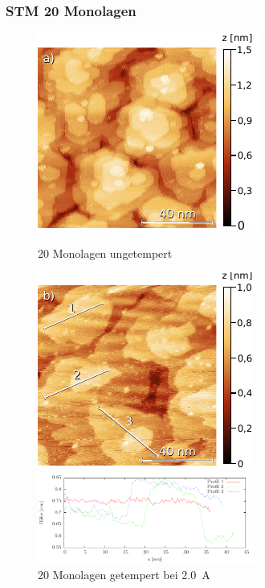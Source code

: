 \documentclass{beamer}
\begin{document}
\begin{frame}
\frametitle{STM 20 Monolagen}
\vspace{-0.3cm}
\begin{figure}[H]
	\begin{minipage}[b]{0.45\textwidth} 
		\includegraphics{bilder/20ML_2kleiner}
		\caption*{20 Monolagen ungetempert}
	\end{minipage}
	\hspace{0.5cm} 
	\begin{minipage}[b]{0.45\textwidth}
		\includegraphics{bilder/20MLget2kleiner}
		\caption*{20 Monolagen getempert bei \SI{2,0}{A}}
	\end{minipage}
	\centering
		\includegraphics[height=3cm]{bilder/profiles20MLget}
\end{figure}
\end{frame}
\end{document}
